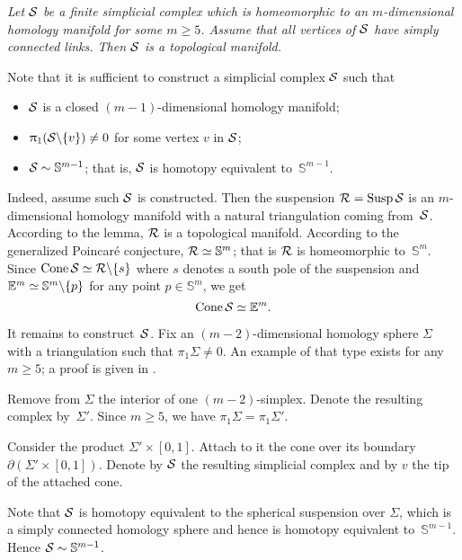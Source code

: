 \medskip

\emph{Let $\mathcal{S}$ be a finite simplicial complex which 
is homeomorphic to an $m$-dimensional homology manifold for some $m\ge 5$.
Assume that  all vertices of
$\mathcal{S}$ have simply connected links.
Then $\mathcal{S}$ is a topological manifold.}

\medskip


Note that it is sufficient to construct a simplicial complex $\mathcal{S}$
such that 
\begin{itemize}
\item $\mathcal{S}$ is a closed $(m-1)$-dimensional homology manifold;
\item $\uppi_1(\mathcal{S}\backslash\{v\})\ne0$ for some vertex $v$ in $\mathcal{S}$;
\item $\mathcal{S}\sim \mathbb{S}^{m-1}$; that is, $\mathcal{S}$ is homotopy equivalent to~$\mathbb{S}^{m-1}$.
\end{itemize}

Indeed, assume such $\mathcal{S}$ is constructed.
Then the suspension
$\spc{R}\z=\Susp\spc{S}$
is an $m$-dimensional homology manifold with a natural triangulation coming from~$\mathcal{S}$.
According to the lemma,
$\mathcal{R}$ is a topological manifold.
According to the generalized Poincar\'{e} conjecture,
$\mathcal{R}\simeq\mathbb{S}^m$;
that is
$\mathcal{R}$ is homeomorphic to~$\mathbb{S}^m$.
Since $\mathop{\rm Cone}\nolimits \mathcal{S}\simeq \mathcal{R}\backslash\{s\}$ where $s$ denotes a south pole of the suspension 
and $\mathbb{E}^m\simeq \mathbb{S}^m\backslash\{p\}$
for any point $p\in \mathbb{S}^m$,
we get 
\[\mathop{\rm Cone}\nolimits \mathcal{S}\simeq\mathbb{E}^m.\]

It remains to construct~$\mathcal{S}$.
Fix an $(m-2)$-dimensional homology sphere $\Sigma$ with a triangulation such that $\pi_1\Sigma\ne0$.
An example of that type exists for any $m\ge 5$; a proof is given in \cite{kervaire}.

Remove from $\Sigma$ the interior of one $(m-2)$-simplex.
Denote the resulting complex by~$\Sigma'$.
Since $m\ge 5$, we have $\pi_1\Sigma=\pi_1\Sigma'$.

Consider the product $\Sigma'\times [0,1]$. 
Attach to it the cone over its boundary $\partial (\Sigma'\times [0,1])$.
Denote by $\mathcal{S}$ the resulting simplicial complex
and by $v$ the tip of the attached cone.

Note that $\mathcal{S}$ is homotopy equivalent to the spherical suspension over $\Sigma$, which is a simply connected homology sphere and hence is homotopy equivalent to~$\mathbb{S}^{m-1}$.
  Hence  $\mathcal{S}\sim\mathbb{S}^{m-1}$.


